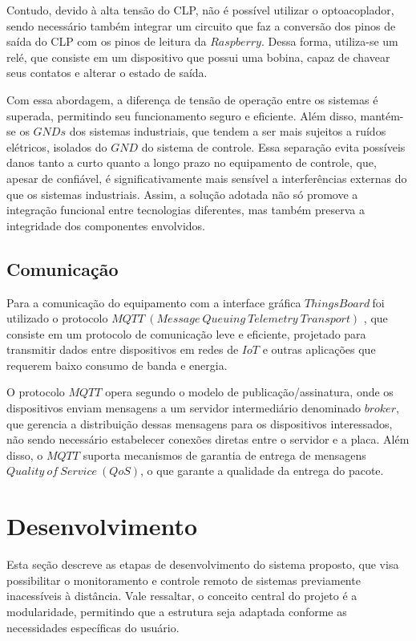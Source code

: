 \documentclass{ecatfg}
\begin{document}
Contudo, devido à alta tensão do CLP, não é possível utilizar o optoacoplador, sendo necessário também integrar um circuito que faz a conversão dos pinos de saída do CLP com os pinos de leitura da $Raspberry$. Dessa forma, utiliza-se um relé, que consiste em um dispositivo que possui uma bobina, capaz de chavear seus contatos e alterar o estado de saída. \par

Com essa abordagem, a diferença de tensão de operação entre os sistemas é superada, permitindo seu funcionamento seguro e eficiente. Além disso, mantém-se os $GNDs$ dos sistemas industriais, que tendem a ser mais sujeitos a ruídos elétricos, isolados do $GND$ do sistema de controle. Essa separação evita possíveis danos tanto a curto quanto a longo prazo no equipamento de controle, que, apesar de confiável, é significativamente mais sensível a interferências externas do que os sistemas industriais. Assim, a solução adotada não só promove a integração funcional entre tecnologias diferentes, mas também preserva a integridade dos componentes envolvidos. \par

\subsection{Comunicação}
Para a comunicação do equipamento com a interface gráfica $ThingsBoard\ $foi utilizado o protocolo $MQTT\ (Message\ Queuing\ Telemetry\ Transport)$ \cite{mqtt}, que consiste em um protocolo de comunicação leve e eficiente, projetado para transmitir dados entre dispositivos em redes de $IoT$ e outras aplicações que requerem baixo consumo de banda e energia.\par

O protocolo $MQTT$ opera segundo o modelo de publicação/assinatura, onde os dispositivos enviam mensagens a um servidor intermediário denominado $broker$, que gerencia a distribuição dessas mensagens para os dispositivos interessados, não sendo necessário estabelecer conexões diretas entre o servidor e a placa. Além disso, o $MQTT$ suporta mecanismos de garantia de entrega de mensagens $Quality\ of\ Service\ (QoS)$, o que garante a qualidade da entrega do pacote.\par

\section{Desenvolvimento}
Esta seção descreve as etapas de desenvolvimento do sistema proposto, que visa possibilitar o monitoramento e controle remoto de sistemas previamente inacessíveis à distância. Vale ressaltar, o conceito central do projeto é a modularidade, permitindo que a estrutura seja adaptada conforme as necessidades específicas do usuário.\par
\end{document}
